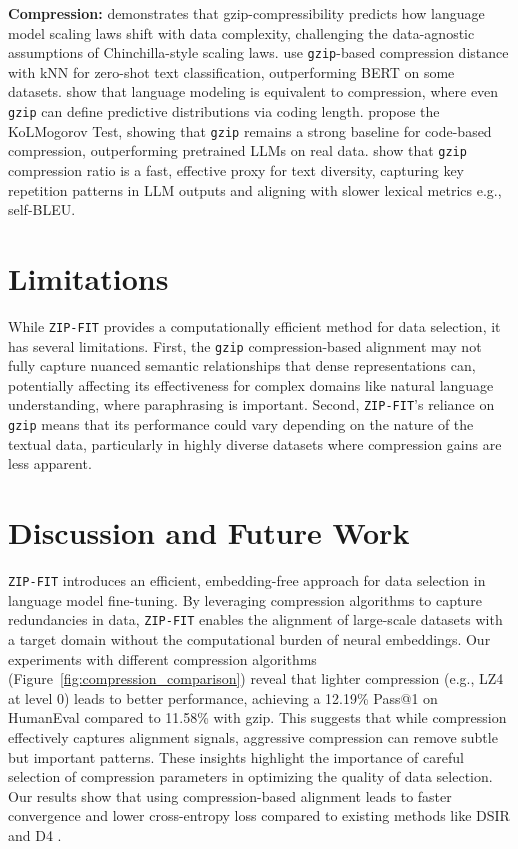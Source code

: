 \textbf{Compression: } 
\citep{pandey2024gzippredictsdatadependentscaling} demonstrates that gzip-compressibility predicts how language model scaling laws shift with data complexity, challenging the data-agnostic assumptions of Chinchilla-style scaling laws.
\citep{jiang2022gzip} use \texttt{gzip}-based compression distance with kNN for zero-shot text classification, outperforming BERT on some datasets.
\citep{languagemodelingcompression} show that language modeling is equivalent to compression, where even \texttt{gzip} can define predictive distributions via coding length.
\citep{yoran2025kolmogorovtestcompressioncode} propose the KoLMogorov Test, showing that \texttt{gzip} remains a strong baseline for code-based compression, outperforming pretrained LLMs on real data.
 show that \texttt{gzip} compression ratio is a fast, effective proxy for text diversity, capturing key repetition patterns in LLM outputs and aligning with slower lexical metrics e.g., self-BLEU.

\section{Limitations}
While \texttt{ZIP-FIT} provides a computationally efficient method for data selection, it has several limitations. 
First, the \texttt{gzip} compression-based alignment may not fully capture nuanced semantic relationships that dense representations can, potentially affecting its effectiveness for complex domains like natural language understanding, where paraphrasing is important. 
Second, \texttt{ZIP-FIT}’s reliance on \texttt{gzip} means that its performance could vary depending on the nature of the textual data, particularly in highly diverse datasets where compression gains are less apparent. 



\section{Discussion and Future Work}

\texttt{ZIP-FIT} introduces an efficient, embedding-free approach for data selection in language model fine-tuning. 
By leveraging compression algorithms to capture redundancies in data, \texttt{ZIP-FIT} enables the alignment of large-scale datasets with a target domain without the computational burden of neural embeddings.
Our experiments with different compression algorithms (Figure~\ref{fig:compression_comparison}) reveal that lighter compression (e.g., LZ4 at level 0) leads to better performance, achieving a 12.19\% Pass@1 on HumanEval compared to 11.58\% with gzip. This suggests that while compression effectively captures alignment signals, aggressive compression can remove subtle but important patterns. These insights highlight the importance of careful selection of compression parameters in optimizing the quality of data selection.
Our results show that using compression-based alignment leads to faster convergence and lower cross-entropy loss compared to existing methods like DSIR and D4 \citep{d4, dsir}.

